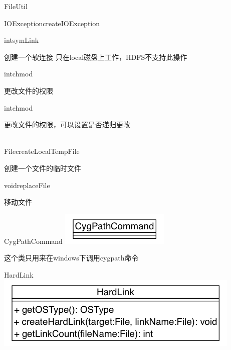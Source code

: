 \begin{XeClass}{FileUtil}
\begin{XeMethod}{\XePrivate}{IOException}{createIOException}
    \end{XeMethod}

    \begin{XeMethod}{\XePublic}{int}{symLink}
         
 创建一个软连接
 只在local磁盘上工作，HDFS不支持此操作

    \end{XeMethod}

    \begin{XeMethod}{\XePublic}{int}{chmod}
         
 更改文件的权限

    \end{XeMethod}

    \begin{XeMethod}{\XePublic}{int}{chmod}
         
 更改文件的权限，可以设置是否递归更改

    \end{XeMethod}

    \begin{XeMethod}{\XePublic \\ \XeFinal}{File}{createLocalTempFile}
         
 创建一个文件的临时文件

    \end{XeMethod}

    \begin{XeMethod}{\XePublic}{void}{replaceFile}
         
 移动文件

    \end{XeMethod}

    \begin{XeInnerClass}{CygPathCommand}
\includegraphics[width=\textwidth]{cdig/CygPathCommand.png}
         
 这个类只用来在windows下调用cygpath命令

    \end{XeInnerClass}
    \begin{XeInnerClass}{HardLink}
\includegraphics[width=\textwidth]{cdig/HardLink.png}
         

\end{XeInnerClass}
\end{XeClass}
